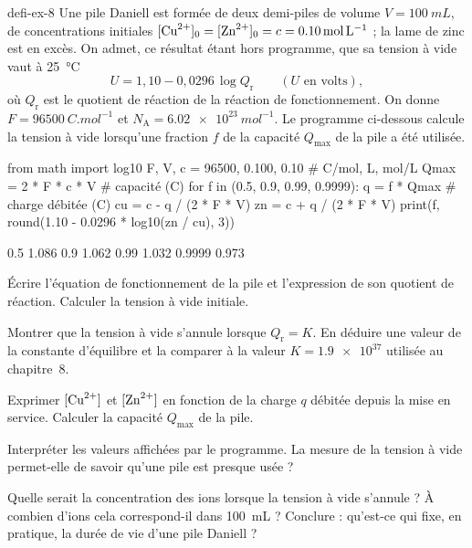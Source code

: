 \begin{blocEdition}{defi-ex-8}
Une pile Daniell est formée de deux demi-piles de volume $V=\qty{100}{mL}$, de concentrations initiales
$[\ce{Cu^2+}]_0=[\ce{Zn^2+}]_0=c=\qty{0,10}{mol.L^{-1}}$ ; la lame de zinc est en excès. On admet, ce résultat étant hors
programme, que sa tension à vide vaut à 25~°C
\[U=1{,}10-0{,}0296\,\log Q_\mathrm{r}\qquad(U\text{ en volts}),\]
où $Q_\mathrm{r}$ est le quotient de réaction de la réaction de fonctionnement. On donne $F=\qty{96500}{C.mol^{-1}}$ et
$N_\mathrm{A}=\qty{6,02e23}{mol^{-1}}$. Le programme ci-dessous calcule la tension à vide lorsqu'une fraction $f$ de la
capacité $Q_{\max}$ de la pile a été utilisée.
\begin{codecote}[0.72]
\begin{pythoncol}
from math import log10
F, V, c = 96500, 0.100, 0.10    # C/mol, L, mol/L
Qmax = 2 * F * c * V            # capacité (C)
for f in (0.5, 0.9, 0.99, 0.9999):
    q = f * Qmax                # charge débitée (C)
    cu = c - q / (2 * F * V)
    zn = c + q / (2 * F * V)
    print(f, round(1.10 - 0.0296 * log10(zn / cu), 3))
\end{pythoncol}
\cote
\begin{consolecol}
0.5 1.086
0.9 1.062
0.99 1.032
0.9999 0.973
\end{consolecol}
\end{codecote}
\begin{questions}
\item Écrire l'équation de fonctionnement de la pile et l'expression de son quotient de réaction. Calculer la tension à
vide initiale.
\item Montrer que la tension à vide s'annule lorsque $Q_\mathrm{r}=K$. En déduire une valeur de la constante d'équilibre
et la comparer à la valeur $K=\num{1.9e37}$ utilisée au chapitre~8.
\item Exprimer $[\ce{Cu^2+}]$ et $[\ce{Zn^2+}]$ en fonction de la charge $q$ débitée depuis la mise en service.
Calculer la capacité $Q_{\max}$ de la pile.
\item Interpréter les valeurs affichées par le programme. La mesure de la tension à vide permet-elle de savoir qu'une
pile est presque usée ?
\item Quelle serait la concentration des ions  lorsque la tension à vide s'annule ? À combien d'ions cela
correspond-il dans 100~mL ? Conclure : qu'est-ce qui fixe, en pratique, la durée de vie d'une pile Daniell ?
\end{questions}
\end{blocEdition}


